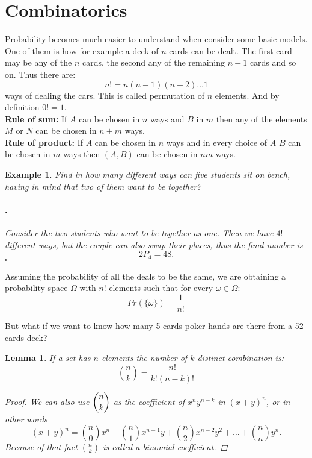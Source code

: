 \documentclass[12pt, a4paper,leqno]{report}
\newenvironment{solution}{\paragraph{\normalfont{\textit{Solution}}.}}{\hfill\null$\square$}
\newtheorem{lemma}{Lemma}[chapter]
\theoremstyle{normal}
\theoremstyle{normal}
\newtheorem{example}{Example}[chapter]
\begin{document}
	\section{Combinatorics}
	Probability becomes much easier to understand when consider some basic models.
	One of them is how for example a deck of $n$ cards can be dealt. The first card may be any of the $n$ cards, the second any of the remaining $n - 1$ cards and so on. Thus there are:
	\[ n! = n(n - 1)(n - 2)\dots 1 \]
	ways of dealing the cars. This is called permutation of $n$ elements. And by definition $0! = 1$.\\
	
	\noindent\textbf{Rule of sum:} If $A$ can be chosen in $n$ ways and $B$ in $m$ then any of the elements $M$ or $N$ can be chosen in $n+m$ ways.\\
	
	\noindent\textbf{Rule of product:} If $A$ can be chosen in $n$ ways and in every choice of $A$ $B$ can be chosen in $m$ ways then $(A, B)$ can be chosen in $nm$ ways.\\
	
	\begin{example}
		Find in how many different ways can five students sit on bench, having in mind that two of them want to be together?
		\begin{solution}
			Consider the two students who want to be together as one. Then we have $4!$ different ways, but the couple can also swap their places, thus the final number is
			\[ 2P_4 = 48. \]  
		\end{solution}
	\end{example}
		
	Assuming the probability of all the deals to be the same, we are obtaining a probability space $\Omega$ with $n!$ elements such that for every $\omega\in\Omega$:
	\[ Pr(\lbrace\omega\rbrace) = \frac{1}{n!} \]
	
	But what if we want to know how many 5 cards poker hands are there from a 52 cards deck?
	
	\begin{lemma}
		If a set has $n$ elements the number of $k$ distinct combination is:
		\[ \binom{n}{k} = \frac{n!}{k!(n-k)!} \]
		\begin{proof}
			We can also use $\dbinom{n}{k}$ as the coefficient of $x^ny^{n-k}$ in $(x+y)^n$, or in other words
			\[ (x+y)^n = \binom{n}{0}x^n + \binom{n}{1}x^{n-1}y + \binom{n}{2}x^{n-2}y^2 +\dots + \binom{n}{n}y^n. \]
			Because of that fact $\binom{n}{k}$ is called a \textit{binomial coefficient}.
		\end{proof}
	\end{lemma}
	
\end{document}
